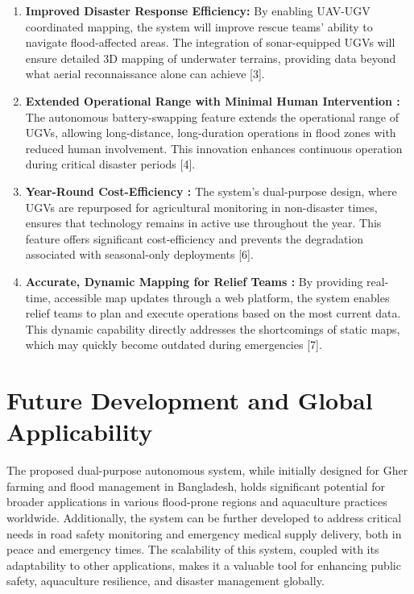 \documentclass[conference]{IEEEtran}
\begin{document}
\begin{enumerate}
	\item \textbf{Improved Disaster Response Efficiency: } 
	By enabling UAV-UGV coordinated mapping, the system will improve rescue teams' ability to navigate flood-affected areas. The integration of sonar-equipped UGVs will ensure detailed 3D mapping of underwater terrains, providing data beyond what aerial reconnaissance alone can achieve [3].

	\item \textbf{Extended Operational Range with Minimal Human Intervention :}
The autonomous battery-swapping feature extends the operational range of UGVs, allowing long-distance, long-duration operations in flood zones with reduced human involvement. This innovation enhances continuous operation during critical disaster periods [4].	
	
	\item \textbf{Year-Round Cost-Efficiency : }
The system’s dual-purpose design, where UGVs are repurposed for agricultural monitoring in non-disaster times, ensures that technology remains in active use throughout the year. This feature offers significant cost-efficiency and prevents the degradation associated with seasonal-only deployments [6].	
	
	\item \textbf{Accurate, Dynamic Mapping for Relief Teams : }
By providing real-time, accessible map updates through a web platform, the system enables relief teams to plan and execute operations based on the most current data. This dynamic capability directly addresses the shortcomings of static maps, which may quickly become outdated during emergencies [7].
		
\end{enumerate}


\section{\textbf{Future Development and Global Applicability}}
The proposed dual-purpose autonomous system, while initially designed for Gher farming and flood management in Bangladesh, holds significant potential for broader applications in various flood-prone regions and aquaculture practices worldwide. Additionally, the system can be further developed to address critical needs in road safety monitoring and emergency medical supply delivery, both in peace and emergency times. The scalability of this system, coupled with its adaptability to other applications, makes it a valuable tool for enhancing public safety, aquaculture resilience, and disaster management globally.
\end{document}
